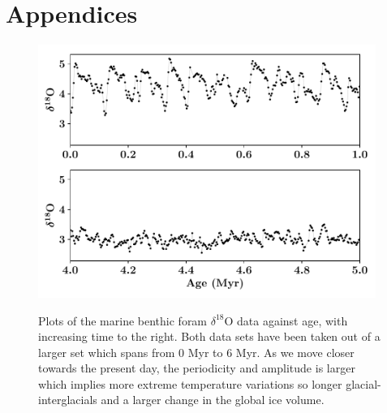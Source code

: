 \documentclass[12pt, onecolumn]{revtex4}    %
\begin{document}
\newpage





\newpage

\section*{Appendices}
\begin{figure}[!h]
\begin{center}
\includegraphics[width=11cm]{figures/foram_data}
\caption[]{Plots of the marine benthic foram $\delta^{18}$O data against age, with increasing time to the right. Both data sets have been taken out of a larger set which spans from 0 Myr to 6 Myr. As we move closer towards the present day, the periodicity and amplitude is larger which implies more extreme temperature variations so longer glacial-interglacials and a larger change in the global ice volume.}
\vspace{-3ex}
\label{fig:foram_data}
\end{center}
\end{figure}
\end{document}
